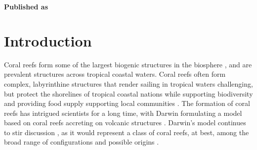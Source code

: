 \vspace{3cm}





\textbf{Published as}

\vspace{0.5cm}


\newpage
\section{Introduction}

Coral reefs form some of the largest biogenic structures in the biosphere
\cite{wiener2021exploration}, and are prevalent structures across tropical
coastal waters. Coral reefs often form complex, labyrinthine structures that
render sailing in tropical waters challenging, but protect the shorelines of
tropical coastal nations while supporting biodiversity and providing food
supply supporting local communities \cite{Moberg1999}. The formation of coral
reefs has intrigued scientists for a long time, with Darwin formulating a model
based on coral reefs accreting on volcanic structures
\cite{darwin1874structure}. Darwin's model continues to stir discussion
\cite{Droxler2021}, as it would represent a class of coral reefs, at best,
among the broad range of configurations and possible origins
\cite{Scoffin1983}.


